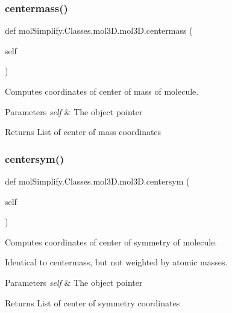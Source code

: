 \subsubsection{\texorpdfstring{centermass()}{centermass()}}
{\footnotesize\ttfamily def mol\+Simplify.\+Classes.\+mol3\+D.\+mol3\+D.\+centermass (\begin{DoxyParamCaption}\item[{}]{self }\end{DoxyParamCaption})}



Computes coordinates of center of mass of molecule. 


\begin{DoxyParams}{Parameters}
{\em self} & The object pointer \\
\hline
\end{DoxyParams}
\begin{DoxyReturn}{Returns}
List of center of mass coordinates 
\end{DoxyReturn}
\mbox{\label{classmolSimplify_1_1Classes_1_1mol3D_1_1mol3D_a0e4c145ac4c16e7be70cec1a3e03f6b7}} 
\subsubsection{\texorpdfstring{centersym()}{centersym()}}
{\footnotesize\ttfamily def mol\+Simplify.\+Classes.\+mol3\+D.\+mol3\+D.\+centersym (\begin{DoxyParamCaption}\item[{}]{self }\end{DoxyParamCaption})}



Computes coordinates of center of symmetry of molecule. 

Identical to centermass, but not weighted by atomic masses. 
\begin{DoxyParams}{Parameters}
{\em self} & The object pointer \\
\hline
\end{DoxyParams}
\begin{DoxyReturn}{Returns}
List of center of symmetry coordinates 
\end{DoxyReturn}
\mbox{\label{classmolSimplify_1_1Classes_1_1mol3D_1_1mol3D_af3406e507c8ccdd33996a7b6f5e3ddfe}} 
